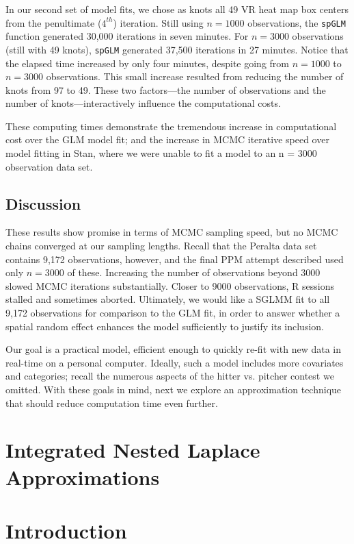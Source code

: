 In our second set of model fits, we chose as knots all 49 VR heat map box centers from the penultimate ($4^{th}$) iteration. Still using $n = 1000$ observations, the \verb|spGLM| function generated 30,000 iterations in seven minutes. For $n = 3000$ observations (still with 49 knots), \verb|spGLM| generated 37,500 iterations in 27 minutes. Notice that the elapsed time increased by only four minutes, despite going from $n = 1000$ to $n = 3000$ observations. This small increase resulted from reducing the number of knots from 97 to 49. These two factors---the number of observations and the number of knots---interactively influence the computational costs. 

These computing times demonstrate the tremendous increase in computational cost over the GLM model fit; and the increase in MCMC iterative speed over model fitting in Stan, where we were unable to fit a model to an n = 3000 observation data set. 

\subsection{Discussion}
These results show promise in terms of MCMC sampling speed, but no MCMC chains converged at our sampling lengths. Recall that the Peralta data set contains 9,172 observations, however, and the final PPM attempt described used only $n = 3000$ of these. Increasing the number of observations beyond 3000 slowed MCMC iterations substantially. Closer to 9000 observations, R sessions stalled and sometimes aborted. Ultimately, we would like a SGLMM fit to all 9,172 observations for comparison to the GLM fit, in order to answer whether a spatial random effect enhances the model sufficiently to justify its inclusion.  

Our goal is a practical model, efficient enough to quickly re-fit with new data in real-time on a personal computer. Ideally, such a model includes more covariates and categories; recall the numerous aspects of the hitter vs. pitcher contest we omitted. With these goals in mind, next we explore an approximation technique that should reduce computation time even further.

\section{Integrated Nested Laplace Approximations} \label{INLA} %

\section{Introduction}

